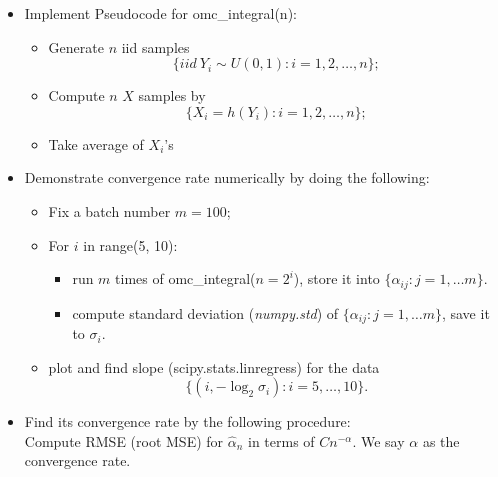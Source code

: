 \documentclass{article}
\begin{document}
\begin{itemize}

 \item Implement  
Pseudocode for omc\_integral(n):
\begin{itemize}
\item Generate $n$ iid samples $$\{iid \ Y_i\sim U(0,1): i = 1, 2, \ldots, n\};$$
\item Compute $n$ $X$ samples by
$$\{X_i = h(Y_i): i = 1, 2, \ldots, n\};$$
\item Take average of $X_i$'s
\end{itemize}


 \item Demonstrate convergence rate numerically by doing the following:
\begin{itemize}
 \item Fix a batch number $m=100$;
 \item For $i$ in range(5, 10): 
\begin{itemize}
 \item run  $m$ times of omc\_integral($n=2^i$), store it into $\{\alpha_{ij}: j = 1, \ldots m\}.$
 \item compute standard deviation ({\it numpy.std}) of $\{\alpha_{ij}: j = 1, \ldots m\}$, save it to $\sigma_i$.
\end{itemize}
\item plot and find slope (scipy.stats.linregress)  for the data
$$\{(i, -\log_2 \sigma_i): i = 5, \ldots, 10\}.$$
\end{itemize}
 \item Find its convergence rate by the following procedure: \\
 Compute RMSE (root MSE) for $\hat \alpha_n$ in terms of $C n^{-\alpha}$.
 We say $\alpha$ as the convergence rate.
\end{itemize}
\end{document}

